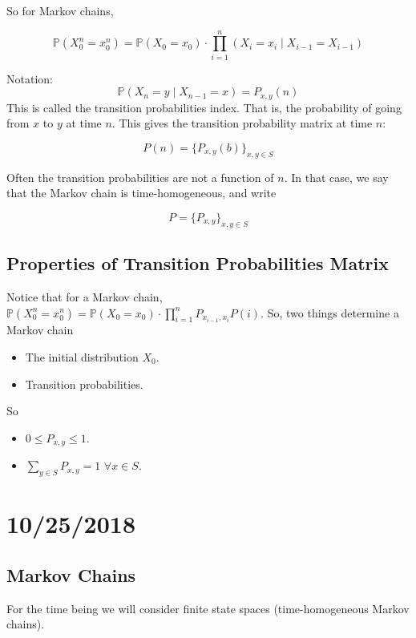 \documentclass[english, course]{Notes}
\begin{document}
So for Markov chains,

\[\mathbb{P}(X_0^n = x_0^n) = \mathbb{P}(X_0 = x_0) \cdot \prod_{i=1}^{n}(X_i = x_i \mid X_{i-1} = X_{i-1})\]

\begin{remark}
Notation:
\[\mathbb{P}(X_n = y \mid X_{n-1} = x) = P_{x,y}(n)\]
This is called the transition probabilities index. That is, the probability of going from $x$ to $y$ at time $n$. This gives the transition probability matrix at time $n$:

\[P(n) = \{P_{x, y}(b)\}_{x, y \in S}\]
\end{remark}

\begin{definition}
Often the transition probabilities are not a function of $n$. In that case, we say that the Markov chain is time-homogeneous, and write

\[P = \{P_{x, y}\}_{x, y \in S}\]
\end{definition}

\subsection{Properties of Transition Probabilities Matrix}

Notice that for a Markov chain, $\mathbb{P}(X_0^n = x_0^n) = \mathbb{P}(X_0 = x_0) \cdot \prod_{i = 1}^{n} P_{x_{i-1}, x_i}P(i)$. So, two things determine a Markov chain

\begin{itemize}
	\item The initial distribution $X_0$.
	\item Transition probabilities.
\end{itemize}

So

\begin{itemize}
	\item $0 \leq P_{x, y} \leq 1$.
	\item $\sum_{y \in S} P_{x, y} = 1$ $\forall x \in S$. 
\end{itemize}

\section{10/25/2018}

\subsection{Markov Chains}
For the time being we will consider finite state spaces (time-homogeneous Markov chains).\\
\end{document}
